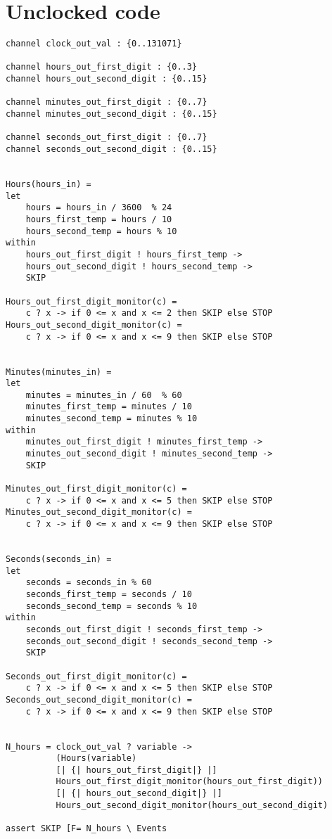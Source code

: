 \section*{Unclocked \cspm{} code}
\begin{verbatim}
channel clock_out_val : {0..131071}

channel hours_out_first_digit : {0..3}
channel hours_out_second_digit : {0..15}

channel minutes_out_first_digit : {0..7}
channel minutes_out_second_digit : {0..15}

channel seconds_out_first_digit : {0..7}
channel seconds_out_second_digit : {0..15}


Hours(hours_in) =
let
    hours = hours_in / 3600  % 24
    hours_first_temp = hours / 10
    hours_second_temp = hours % 10
within
    hours_out_first_digit ! hours_first_temp ->
    hours_out_second_digit ! hours_second_temp ->
    SKIP

Hours_out_first_digit_monitor(c) =
    c ? x -> if 0 <= x and x <= 2 then SKIP else STOP
Hours_out_second_digit_monitor(c) =
    c ? x -> if 0 <= x and x <= 9 then SKIP else STOP


Minutes(minutes_in) =
let
    minutes = minutes_in / 60  % 60
    minutes_first_temp = minutes / 10
    minutes_second_temp = minutes % 10
within
    minutes_out_first_digit ! minutes_first_temp ->
    minutes_out_second_digit ! minutes_second_temp ->
    SKIP

Minutes_out_first_digit_monitor(c) =
    c ? x -> if 0 <= x and x <= 5 then SKIP else STOP
Minutes_out_second_digit_monitor(c) =
    c ? x -> if 0 <= x and x <= 9 then SKIP else STOP


Seconds(seconds_in) =
let
    seconds = seconds_in % 60
    seconds_first_temp = seconds / 10
    seconds_second_temp = seconds % 10
within
    seconds_out_first_digit ! seconds_first_temp ->
    seconds_out_second_digit ! seconds_second_temp ->
    SKIP

Seconds_out_first_digit_monitor(c) =
    c ? x -> if 0 <= x and x <= 5 then SKIP else STOP
Seconds_out_second_digit_monitor(c) =
    c ? x -> if 0 <= x and x <= 9 then SKIP else STOP


N_hours = clock_out_val ? variable ->
          (Hours(variable)
          [| {| hours_out_first_digit|} |]
          Hours_out_first_digit_monitor(hours_out_first_digit))
          [| {| hours_out_second_digit|} |]
          Hours_out_second_digit_monitor(hours_out_second_digit)

assert SKIP [F= N_hours \ Events



\end{verbatim}
